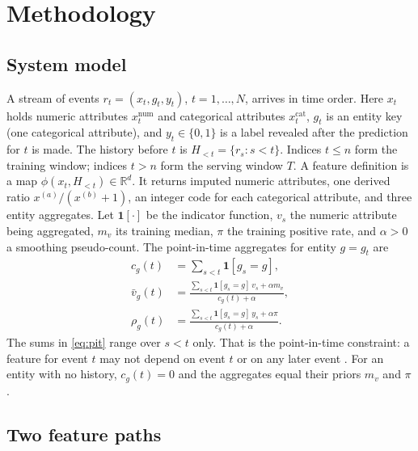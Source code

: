 \documentclass[journal]{IEEEtran}
\begin{document}
\section{Methodology}
\label{sec:method}

\subsection{System model}
\label{sec:model}

A stream of events $r_t=(x_t,g_t,y_t)$, $t=1,\dots,N$, arrives in time order. Here $x_t$ holds numeric attributes $x_t^{\mathrm{num}}$ and categorical attributes $x_t^{\mathrm{cat}}$, $g_t$ is an entity key (one categorical attribute), and $y_t\in\{0,1\}$ is a label revealed after the prediction for $t$ is made. The history before $t$ is $H_{<t}=\{r_s : s<t\}$. Indices $t\le n$ form the training window; indices $t>n$ form the serving window $T$. A feature definition is a map $\phi(x_t,H_{<t})\in\mathbb{R}^d$. It returns imputed numeric attributes, one derived ratio $x^{(a)}/(x^{(b)}+1)$, an integer code for each categorical attribute, and three entity aggregates. Let $\mathbf{1}[\cdot]$ be the indicator function, $v_s$ the numeric attribute being aggregated, $m_v$ its training median, $\pi$ the training positive rate, and $\alpha>0$ a smoothing pseudo-count. The point-in-time aggregates for entity $g=g_t$ are
\begin{equation}
\begin{aligned}
c_g(t) &= \textstyle\sum_{s<t}\mathbf{1}[g_s=g],\\
\bar v_g(t) &= \frac{\sum_{s<t}\mathbf{1}[g_s=g]\,v_s+\alpha m_v}{c_g(t)+\alpha},\\
\rho_g(t) &= \frac{\sum_{s<t}\mathbf{1}[g_s=g]\,y_s+\alpha\pi}{c_g(t)+\alpha}.
\end{aligned}
\label{eq:pit}
\end{equation}
The sums in \eqref{eq:pit} range over $s<t$ only. That is the point-in-time constraint: a feature for event $t$ may not depend on event $t$ or on any later event \cite{kaufman2012leakage}. For an entity with no history, $c_g(t)=0$ and the aggregates equal their priors $m_v$ and $\pi$.

\subsection{Two feature paths}
\label{sec:paths}
\end{document}
